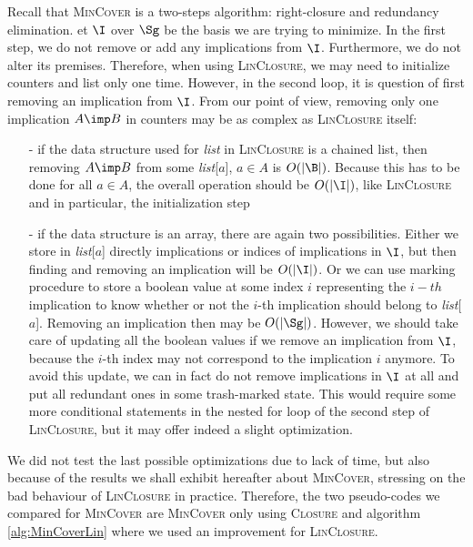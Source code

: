 Recall that \textsc{MinCover} is a two-steps algorithm: right-closure and redundancy elimination. et $\I$ over $\Sg$ be the basis we are trying to minimize. In the first step, we do not remove or add any implications from
$\I$. Furthermore, we do not alter its premises. Therefore, when using
\textsc{LinClosure}, we may need to initialize counters and list only one
time. However, in the second loop, it is question of first removing an implication from $\I$. From our point of view, removing only one implication
$A \imp B$ in counters may be as complex as \textsc{LinClosure} itself:
\begin{itemize}
	\item[-] if the data structure used for \textit{list} in \textsc{LinClosure}
	is a chained list, then removing $A \imp B$ from some \textit{list}[$a$], $a \in A$ is $O(|\B|)$. Because this has to be done for all $a \in A$, the 
	overall operation should be $O(|\I|)$, like \textsc{LinClosure} and in particular, the initialization step
	\item[-] if the data structure is an array, there are again two possibilities. Either we store in \textit{list}[$a$] directly implications or indices of implications in $\I$, but then finding and removing an implication will be $O(|\I|)$. Or we can use marking procedure to store a boolean value at some index $i$ representing the $i-th$ implication to know
	whether or not the $i$-th implication should belong to \textit{list}[$a$]. Removing an implication then may be $O(|\Sg|)$. However, we should take care
	of updating all the boolean values  if we remove an implication from $\I$, because the $i$-th index may not correspond to the implication $i$ anymore. To avoid this update, we can in fact do not remove implications in $\I$ at
	all and put all redundant ones in some trash-marked state. This would require some more conditional statements in the nested for loop of the second step of \textsc{LinClosure}, but it may offer indeed a slight optimization.
\end{itemize}
\noindent We did not test the last possible optimizations due to lack of time,
but also because of the results we shall exhibit hereafter about \textsc{MinCover}, stressing on the bad behaviour of \textsc{LinClosure} in practice. Therefore, the two pseudo-codes we compared for \textsc{MinCover} are
\textsc{MinCover} only using \textsc{Closure} and algorithm \ref{alg:MinCoverLin} where we used an improvement for \textsc{LinClosure}.

\vspace{1.2em}

